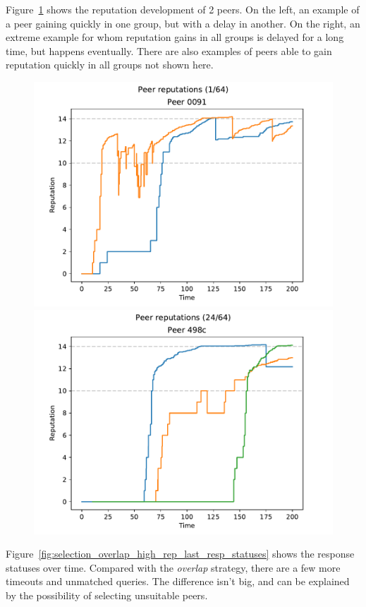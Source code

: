 Figure~\ref{fig:selection_overlap_high_rep_last_peer_reps} shows the reputation
development of 2 peers. On the left, an example of a peer gaining quickly in one
group, but with a delay in another. On the right, an extreme example for whom
reputation gains in all groups is delayed for a long time, but happens
eventually. There are also examples of peers able to gain reputation quickly in
all groups not shown here.

\begin{figure}[t]
\centering
\includegraphics[width=0.5\columnwidth]{figures/selection_overlap_high_rep_last_peer_reps_1_of_64}%
\includegraphics[width=0.5\columnwidth]{figures/selection_overlap_high_rep_last_peer_reps_24_of_64}
\label{fig:selection_overlap_high_rep_last_peer_reps}
\end{figure}

Figure~\ref{fig:selection_overlap_high_rep_last_resp_statuses} shows the
response statuses over time. Compared with the \emph{overlap} strategy, there
are a few more timeouts and unmatched queries. The difference isn't big, and can
be explained by the possibility of selecting unsuitable peers.

